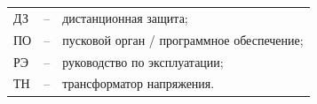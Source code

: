 \color{uniblue}\section*{}
\color{black}
\begin{longtable}{>{\raggedright\arraybackslash}m{2cm}>{\raggedright\arraybackslash}m{0.5cm}>{\raggedright\arraybackslash}m{20cm}}
\endfirsthead\endhead\endfoot\endlastfoot
ДЗ & -- & дистанционная защита; \\
ПО & -- & пусковой орган / программное обеспечение; \\
РЭ & -- & руководство по эксплуатации; \\
ТН & -- & трансформатор напряжения. \\
\end{longtable}
